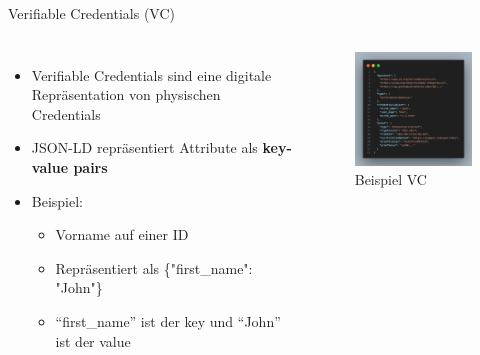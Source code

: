 \documentclass[
	german,%
	authorontitle=true,
	]{bfhbeamer}
\begin{document}
\begin{frame}{Verifiable Credentials (VC)}
    \begin{columns}[onlytextwidth,T]
        \column{70mm}  

    \begin{itemize}
        \item Verifiable Credentials sind eine digitale Repräsentation von physischen Credentials
        \item JSON-LD repräsentiert Attribute als \textbf{key-value pairs}
        \item Beispiel:
        \begin{itemize}
            \item Vorname auf einer ID
            \item Repräsentiert als \{"first\_name": "John"\}
            \item ``first\_name'' ist der key und ``John'' ist der value
        \end{itemize}
    \end{itemize}

    \column{70mm}
    \begin{figure}
        \centering
        \includegraphics[width=60mm]{../img/VCSignExample.png}
        \caption{Beispiel VC}
    \end{figure}

    \end{columns}
\end{frame}
\end{document}
